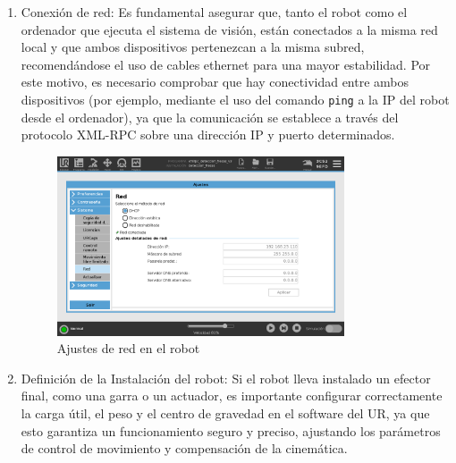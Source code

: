\begin{enumerate}
  \item Conexión de red: Es fundamental asegurar que, tanto el robot como el ordenador que ejecuta el sistema de visión, están conectados a la misma red local y que ambos dispositivos pertenezcan a la misma subred, recomendándose el uso de cables ethernet para una mayor estabilidad. Por este motivo, es necesario comprobar que hay conectividad entre ambos dispositivos (por ejemplo, mediante el uso del comando \texttt{ping} a la IP del robot desde el ordenador), ya que la comunicación se establece a través del protocolo XML-RPC sobre una dirección IP y puerto determinados.
    
      \begin{figure} [H]
        \begin{center}
          \includegraphics[width=85mm]{figs/Ajustes de Red UR.png}
        \end{center}
        \caption{Ajustes de red en el robot}
        \label{fig:ajustes_red_UR}
      \end{figure} 
  
  \item Definición de la Instalación del robot: Si el robot lleva instalado un efector final, como una garra o un actuador, es importante configurar correctamente la carga útil, el peso y el centro de gravedad en el software del UR, ya que esto garantiza un funcionamiento seguro y preciso, ajustando los parámetros de control de movimiento y compensación de la cinemática.
  

\end{enumerate}

